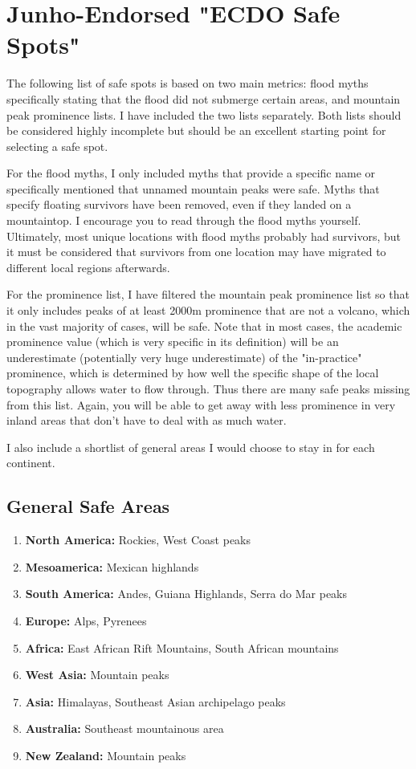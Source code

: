 \documentclass[10pt,twocolumn,letterpaper]{article}
\begin{document}
\section{Junho-Endorsed "ECDO Safe Spots"}

The following list of safe spots is based on two main metrics: flood myths specifically stating that the flood did not submerge certain areas, and mountain peak prominence lists. I have included the two lists separately. Both lists should be considered highly incomplete but should be an excellent starting point for selecting a safe spot.

For the flood myths, I only included myths that provide a specific name or specifically mentioned that unnamed mountain peaks were safe. Myths that specify floating survivors have been removed, even if they landed on a mountaintop. I encourage you to read through the flood myths yourself. Ultimately, most unique locations with flood myths probably had survivors, but it must be considered that survivors from one location may have migrated to different local regions afterwards.

For the prominence list, I have filtered the mountain peak prominence list so that it only includes peaks of at least 2000m prominence that are not a volcano, which in the vast majority of cases, will be safe. Note that in most cases, the academic prominence value (which is very specific in its definition) will be an underestimate (potentially very huge underestimate) of the "in-practice" prominence, which is determined by how well the specific shape of the local topography allows water to flow through. Thus there are many safe peaks missing from this list. Again, you will be able to get away with less prominence in very inland areas that don't have to deal with as much water.

I also include a shortlist of general areas I would choose to stay in for each continent.

\subsection{General Safe Areas}

\begin{flushleft}
\begin{enumerate}
    \item \textbf{North America:} Rockies, West Coast peaks
    \item \textbf{Mesoamerica:} Mexican highlands
    \item \textbf{South America:} Andes, Guiana Highlands, Serra do Mar peaks
    \item \textbf{Europe:} Alps, Pyrenees
    \item \textbf{Africa:} East African Rift Mountains, South African mountains
    \item \textbf{West Asia:} Mountain peaks
    \item \textbf{Asia:} Himalayas, Southeast Asian archipelago peaks
    \item \textbf{Australia:} Southeast mountainous area
    \item \textbf{New Zealand:} Mountain peaks
\end{enumerate}
\end{flushleft}
\end{document}
